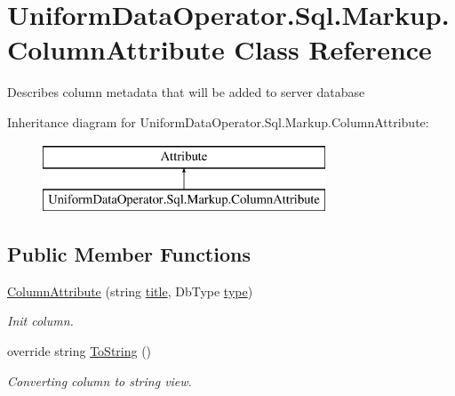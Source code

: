 \hypertarget{class_uniform_data_operator_1_1_sql_1_1_markup_1_1_column_attribute}{}\section{Uniform\+Data\+Operator.\+Sql.\+Markup.\+Column\+Attribute Class Reference}
\label{class_uniform_data_operator_1_1_sql_1_1_markup_1_1_column_attribute}


Describes column metadata that will be added to server database  


Inheritance diagram for Uniform\+Data\+Operator.\+Sql.\+Markup.\+Column\+Attribute\+:\begin{figure}[H]
\begin{center}
\leavevmode
\includegraphics[height=2.000000cm]{d0/d68/class_uniform_data_operator_1_1_sql_1_1_markup_1_1_column_attribute}
\end{center}
\end{figure}
\subsection*{Public Member Functions}
\begin{DoxyCompactItemize}
\item 
\mbox{\hyperlink{class_uniform_data_operator_1_1_sql_1_1_markup_1_1_column_attribute_ace297ed7882b6fb0ee79a837a1ad6eac}{Column\+Attribute}} (string \mbox{\hyperlink{class_uniform_data_operator_1_1_sql_1_1_markup_1_1_column_attribute_ab12600e7022c9c4aa36816f89e360d01}{title}}, Db\+Type \mbox{\hyperlink{class_uniform_data_operator_1_1_sql_1_1_markup_1_1_column_attribute_a35e345cb138b9b436a62d1d8594c8e1a}{type}})
\begin{DoxyCompactList}\small\item\em Init column. \end{DoxyCompactList}\item 
override string \mbox{\hyperlink{class_uniform_data_operator_1_1_sql_1_1_markup_1_1_column_attribute_ad43634da4c1bf9fc730ad81b7cec5d6e}{To\+String}} ()
\begin{DoxyCompactList}\small\item\em Converting column to string view. \end{DoxyCompactList}\end{DoxyCompactItemize}
